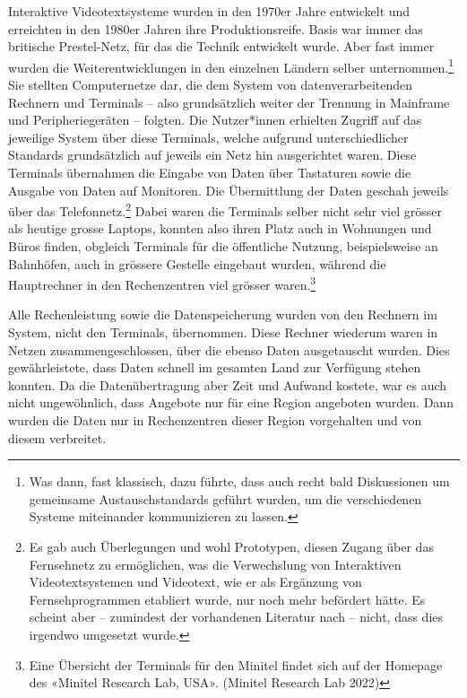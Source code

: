 \documentclass[a4paper,
fontsize=11pt,
oneside,
numbers=noperiodatend,
parskip=half-,
bibliography=totoc,
final
]{scrartcl}
\begin{document}
Interaktive Videotextsysteme wurden in den 1970er Jahre entwickelt und
erreichten in den 1980er Jahren ihre Produktionsreife. Basis war immer
das britische Prestel-Netz, für das die Technik entwickelt wurde. Aber
fast immer wurden die Weiterentwicklungen in den einzelnen Ländern
selber unternommen.\footnote{Was dann, fast klassisch, dazu führte, dass
  auch recht bald Diskussionen um gemeinsame Austauschstandards geführt
  wurden, um die verschiedenen Systeme miteinander kommunizieren zu
  lassen.} Sie stellten Computernetze dar, die dem System von
datenverarbeitenden Rechnern und Terminals -- also grundsätzlich weiter
der Trennung in Mainframe und Peripheriegeräten -- folgten. Die
Nutzer*innen erhielten Zugriff auf das jeweilige System über diese
Terminals, welche aufgrund unterschiedlicher Standards grundsätzlich auf
jeweils ein Netz hin ausgerichtet waren. Diese Terminals übernahmen die
Eingabe von Daten über Tastaturen sowie die Ausgabe von Daten auf
Monitoren. Die Übermittlung der Daten geschah jeweils über das
Telefonnetz.\footnote{Es gab auch Überlegungen und wohl Prototypen,
  diesen Zugang über das Fernsehnetz zu ermöglichen, was die
  Verwechslung von Interaktiven Videotextsystemen und Videotext, wie er
  als Ergänzung von Fernsehprogrammen etabliert wurde, nur noch mehr
  befördert hätte. Es scheint aber -- zumindest der vorhandenen
  Literatur nach -- nicht, dass dies irgendwo umgesetzt wurde.} Dabei
waren die Terminals selber nicht sehr viel grösser als heutige grosse
Laptops, konnten also ihren Platz auch in Wohnungen und Büros finden,
obgleich Terminals für die öffentliche Nutzung, beispielsweise an
Bahnhöfen, auch in grössere Gestelle eingebaut wurden, während die
Hauptrechner in den Rechenzentren viel grösser waren.\footnote{Eine
  Übersicht der Terminals für den Minitel findet sich auf der Homepage
  des «Minitel Research Lab, USA». (Minitel Research Lab 2022)}

Alle Rechenleistung sowie die Datenspeicherung wurden von den Rechnern
im System, nicht den Terminals, übernommen. Diese Rechner wiederum waren
in Netzen zusammengeschlossen, über die ebenso Daten ausgetauscht
wurden. Dies gewährleistete, dass Daten schnell im gesamten Land zur
Verfügung stehen konnten. Da die Datenübertragung aber Zeit und Aufwand
kostete, war es auch nicht ungewöhnlich, dass Angebote nur für eine
Region angeboten wurden. Dann wurden die Daten nur in Rechenzentren
dieser Region vorgehalten und von diesem verbreitet.
\end{document}
